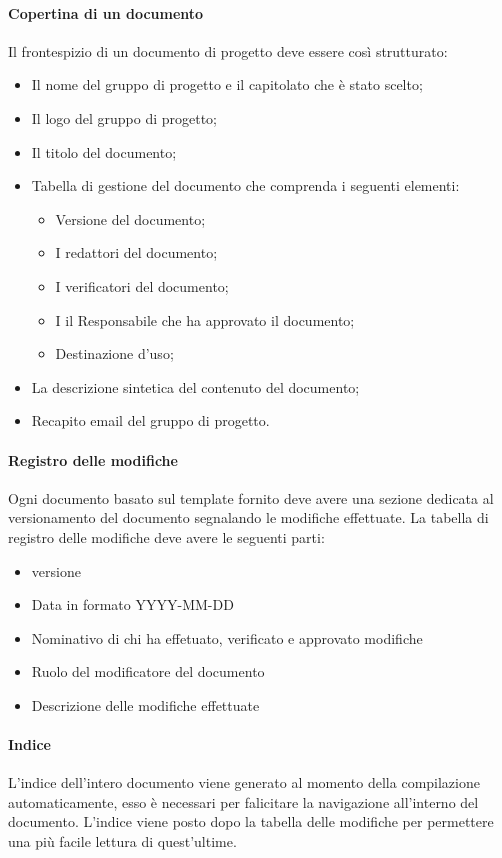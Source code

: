 \paragraph{Copertina di un documento}
Il frontespizio di un documento di progetto deve essere così strutturato:
\begin{itemize}
  \item Il nome del gruppo di progetto e il capitolato che è stato scelto;
  \item Il logo del gruppo di progetto;
  \item Il titolo del documento;
  \item Tabella di gestione del documento che comprenda i seguenti elementi:
  \begin{itemize}
    \item Versione del documento;
    \item I redattori del documento;
    \item I verificatori del documento;
    \item I il Responsabile che ha approvato il documento;
    \item Destinazione d'uso;
  \end{itemize}
  \item La descrizione sintetica del contenuto del documento;
  \item Recapito email del gruppo di progetto.
\end{itemize}
\paragraph{Registro delle modifiche}
Ogni documento basato sul template fornito deve avere una sezione dedicata al versionamento
del documento segnalando le modifiche effettuate.
La tabella di registro delle modifiche deve avere le seguenti parti:
\begin{itemize}
  \item versione
  \item Data in formato YYYY-MM-DD
  \item Nominativo di chi ha effetuato, verificato e approvato modifiche
  \item Ruolo del modificatore del documento
  \item Descrizione delle modifiche effettuate
\end{itemize}
\paragraph{Indice}
L'indice dell'intero documento viene generato al momento della compilazione
automaticamente, esso è necessari per falicitare la navigazione all'interno del
documento.
L'indice viene posto dopo la tabella delle modifiche per permettere una più facile
lettura di quest'ultime.
